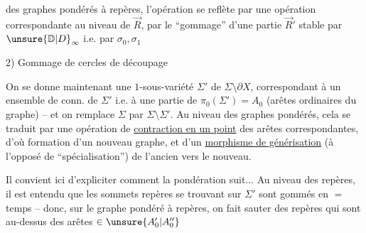 des graphes pondérés à repères, l'opération  se reflète par une opération correspondante au niveau de $\vec R$, par le ``gommage'' d'une partie $\vec R'$ stable par $\unsure{\mathbb D|D}_\infty$ i.e. par $\sigma_0,\sigma_1$

2) Gommage de cercles de découpage

On se donne maintenant une  $1$-sous-variété  $\Sigma'$ de $\Sigma\setminus\partial X$, correspondant à un ensemble  de  conn. de $\Sigma'$ i.e. à une partie  de $\pi_0(\Sigma')=A_0$ (arêtes ordinaires du graphe) -- et on remplace $\Sigma$ par $\Sigma\setminus\Sigma'$. Au niveau des graphes pondérés, cela se traduit par une opération de \uline{contraction en un point} des arêtes correspondantes, d'où formation d'un nouveau graphe, et d'un \uline{morphisme de générisation} (à l'opposé de ``spécialisation'') de l'ancien vers le nouveau.

Il convient ici d'expliciter comment la pondération suit... Au niveau des repères, il est entendu que les sommets repères se trouvant sur $\Sigma'$ sont gommés en $=$ temps -- donc, sur le graphe pondéré à repères, on fait sauter  des repères qui sont au-dessus des arêtes $\in \unsure{A'_0|A''_0}$
